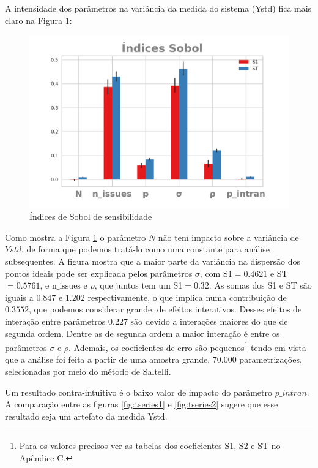 A intensidade dos parâmetros na variância da medida do sistema (Ystd) fica mais
claro na Figura \ref{fig:sobol1}:

\begin{figure}[H]
  \centering
  \includegraphics{ims/barplotmuto5k.png}
  \caption{Índices de Sobol de sensibilidade}
  \label{fig:sobol1}
\end{figure}

Como mostra a Figura \ref{fig:sobol1} o parâmetro \(N\) não tem impacto sobre a
variância de \(Ystd\), de forma que podemos tratá-lo como uma constante para
análise subsequentes. A figura mostra que a maior parte da variância na
dispersão dos pontos ideais pode ser explicada pelos parâmetros \(\sigma\), com S1\(
= 0.4621\) e ST \(= 0.5761\), e \(\text{n\_issues}\) e \(\rho\), que juntos tem um
S1\(= 0.32\). As somas dos S1 e ST são iguais a \(0.847\) e \(1.202\)
respectivamente, o que implica numa contribuição de \(0.3552\), que podemos
considerar grande, de efeitos interativos. Desses efeitos de interação entre
parâmetros 0.227 são devido a interações maiores do que de segunda ordem. Dentre
as de segunda ordem a maior interação é entre os parâmetros \(\sigma\) e \(\rho\).
Ademais, os coeficientes de erro são pequenos\footnote{Para os valores precisos
  ver as tabelas dos coeficientes S1, S2 e ST no Apêndice C.} tendo em vista que
a análise foi feita a partir de uma amostra grande, 70.000 parametrizações,
selecionadas por meio do método de Saltelli.

Um resultado contra-intuitivo é o baixo valor de impacto do parâmetro
\(p\_intran\). A comparação entre as figuras \ref{fig:tseries1} e
\ref{fig:tseries2} sugere que esse resultado seja um artefato da medida Ystd.

